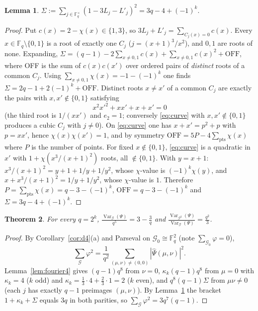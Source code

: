 \documentclass[11pt,a4paper]{amsart}
\newtheorem{theorem}{Theorem}[section]
\newtheorem{lemma}[theorem]{Lemma}
\theoremstyle{definition}
\newcommand{\F}{\mathbb{F}}
\newcommand{\G}{\mathcal{G}}
\newcommand{\Var}{\operatorname{Var}}
\begin{document}
\begin{lemma}\label{lem:sigma}
$\displaystyle\Sigma:=\sum_{j\in\F_q^\times}(1-3L_j-L'_j)^2=3q-4+(-1)^k.$
\end{lemma}
\begin{proof}
Put $c(x)=2-\chi(x)\in\{1,3\}$, so $3L_j+L'_j=\sum_{C_j(x)=0}c(x)$. Every $x\in\F_q\setminus\{0,1\}$ is a root of exactly one $C_j$ ($j=(x+1)^3/x^2$), and $0,1$ are roots of none. Expanding,
$\Sigma=(q-1)-2\sum_{x\ne0,1}c(x)+\sum_{x\ne0,1}c(x)^2+\mathrm{OFF}$, where OFF is the sum of $c(x)c(x')$ over ordered pairs of \emph{distinct} roots of a common $C_j$. Using $\sum_{x\ne0,1}\chi(x)=-1-(-1)^k$ one finds $\Sigma=2q-1+2(-1)^k+\mathrm{OFF}$. Distinct roots $x\ne x'$ of a common $C_j$ are exactly the pairs with $x,x'\notin\{0,1\}$ satisfying
\begin{equation}\label{eq:curve}
x^2x'^2+xx'+x+x'=0
\end{equation}
(the third root is $1/(xx')$ and $e_2=1$; conversely \eqref{eq:curve} with $x,x'\notin\{0,1\}$ produces a cubic $C_j$ with $j\ne0$). On \eqref{eq:curve} one has $x+x'=p^2+p$ with $p=xx'$, hence $\chi(x)\chi(x')=1$, and by symmetry $\mathrm{OFF}=5P-4\sum_{\text{pts}}\chi(x)$ where $P$ is the number of points. For fixed $x\notin\{0,1\}$, \eqref{eq:curve} is a quadratic in $x'$ with $1+\chi(x^3/(x+1)^2)$ roots, all $\notin\{0,1\}$. With $y=x+1$: $x^3/(x+1)^2=y+1+1/y+1/y^2$, whose $\chi$-value is $(-1)^k\chi(y)$, and $x+x^3/(x+1)^2=1/y+1/y^2$, whose $\chi$-value is $1$. Therefore $P=\sum_{\text{pts}}\chi(x)=q-3-(-1)^k$, $\mathrm{OFF}=q-3-(-1)^k$ and $\Sigma=3q-4+(-1)^k$.
\end{proof}

\begin{theorem}\label{thm:varG4}
For every $q=2^k$, $\displaystyle\frac{\Var_\G(\Psi)}{q^5}=3-\frac3q$ and $\displaystyle\frac{\Var_{\G^2}(\Psi)}{\Var_\G(\Psi)}=\frac{q^2}3$.
\end{theorem}
\begin{proof}
By Corollary~\ref{cor:d4}(a) and Parseval on $\G_0\cong\F_q^2$ (note $\sum_{\G_0}\varphi=0$),
\[
\sum_{\G}\varphi^2=\frac1{q^2}\sum_{(\mu,\nu)\ne(0,0)}|\widehat\Psi(\mu,\nu)|^2 .
\]
Lemma~\ref{lem:fourier4} gives $(q-1)q^8$ from $\nu=0$, $\kappa_k(q-1)q^8$ from $\mu=0$ with $\kappa_k=4$ ($k$ odd) and $\kappa_k=\frac13\cdot4+\frac23\cdot1=2$ ($k$ even), and $q^8(q-1)\Sigma$ from $\mu\nu\ne0$ (each $j$ has exactly $q-1$ preimages $(\mu,\nu)$). By Lemma~\ref{lem:sigma} the bracket $1+\kappa_k+\Sigma$ equals $3q$ in both parities, so $\sum_\G\varphi^2=3q^7(q-1)$.
\end{proof}
\end{document}
